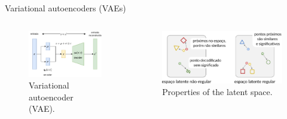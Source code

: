 \documentclass[aspectratio=169,xcolor=dvipsnames]{beamer}
\begin{document}
\begin{frame}{Variational autoencoders (VAEs)}
    \begin{columns}[t]
        \begin{figure}
            \centering
            \includegraphics[width=0.8\linewidth]{imgs/vae.pdf}
            \caption{Variational autoencoder (VAE).}
        \end{figure}

        \begin{figure}
            \centering
            \includegraphics[width=0.9\linewidth]{imgs/latent-space-properties.png}
            \caption{Properties of the latent space.}
        \end{figure}

    \end{columns}
\end{frame}
\end{document}

